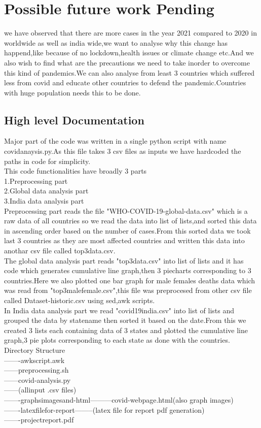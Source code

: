 \chapter{Possible future work Pending}
    we have observed that there are more cases in the year 2021 compared to 2020 in
 worldwide as well as india wide,we want to analyse why this change has happend,like because of no lockdown,health issues or climate change etc.And we also wish to find what 
are the precautions we need to take inorder to overcome this kind of pandemics.We can also analyse from least 3 countries which suffered less from covid and educate other countries to defend the pandemic.Countries with huge population needs this to be done.

\section{High level Documentation}
 Major part of the code was written in a single python script with name covidanaysis.py.As this file takes 3 csv files as inputs we have hardcoded the paths in code for simplicity.\\
 This code functionalities have broadly 3 parts\\ 
 1.Preprocessing part\\
 2.Global data analysis part\\
 3.India data analysis part \\
 Preprocessing part reads the file "WHO-COVID-19-global-data.csv" which is a raw data of all countries so we read the data into list of lists,and sorted this data in ascending order based on the number of cases.From this sorted data we took last 3 countries as they are most affected countries and written this data into anothar csv file called top3data.csv.\\
 The global data analysis part reads "top3data.csv" into list of lists and it has code which generates cumulative line graph,then 3 piecharts corresponding to 3 countries.Here we also plotted one bar graph for male females deaths data which was read from "top3malefemale.csv",this file was preprocesed from other csv file called Dataset-historic.csv using sed,awk scripts.\\
 In India data analysis part we read "covid19india.csv" into list of lists and grouped the data by statename then sorted it based on the date.From this we created 3 lists each containing data of 3 states and plotted the cumulative line graph,3 pie plots corresponding to each state as done with the countries.\\
 Directory Structure\\
 -------awkscript.awk\\
 ------preprocessing.sh\\
 ------covid-analysis.py\\
 ------(allinput .csv files)\\
 -------graphsimagesand-html---------covid-webpage.html(also graph images)\\
 -------latexfilefor-report--------(latex file for report pdf generation)\\
 -------projectreport.pdf\\

